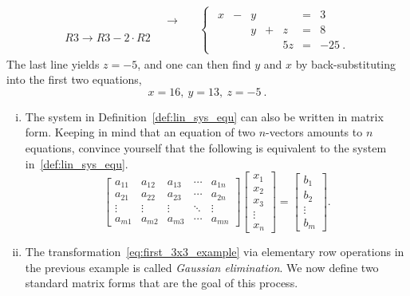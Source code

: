 \begin{example}
\begin{equation}
\begin{split}
\begin{array}{cc}
& ~~~\rightarrow~~~ \\
& \\
R3 \rightarrow R3 - 2 \cdot R2 &
\end{array}
& \begin{cases}
\begin{array}{rrrrrrr}
x & - & y &  &  & = & 3 \phantom{\:.} \\
& & y & + & z & = & 8 \phantom{\:.} \\
& & & & 5 z & = & -25 \:.
\end{array} \end{cases}  
\end{split}
\end{equation}
The last line yields $z = -5$, and one can then find $y$ and $x$ by back-substituting into the first two equations,
\[ x = 16, \: y = 13, \: z = -5 \:. \]
\end{example}

\begin{remark}
\begin{enumerate}[(i)]
\item The system in Definition~\ref{def:lin_sys_equ} can also be written in matrix form. Keeping in mind that an equation of two $n$-vectors amounts to $n$ equations, convince yourself that the following is equivalent to the system in~\ref{def:lin_sys_equ}.
\[
\begin{bmatrix}
a_{11} & a_{12} & a_{13} & \cdots & a_{1n} \\
a_{21} & a_{22} & a_{23} & \cdots & a_{2n} \\
\vdots & \vdots & \vdots & \ddots & \vdots \\
a_{m1} & a_{m2} & a_{m3 }& \cdots & a_{mn}
\end{bmatrix} \begin{bmatrix}
x_1 \\ x_2 \\ x_3 \\ \vdots \\ x_n
\end{bmatrix} = \begin{bmatrix}
b_1 \\ b_2 \\ \vdots \\ b_m
\end{bmatrix}.
\]
\item The transformation~\eqref{eq:first_3x3_example} via elementary row operations in the previous example is called \emph{Gaussian elimination}. We now define two standard matrix forms that are the goal of this process.
\end{enumerate}
\end{remark}

